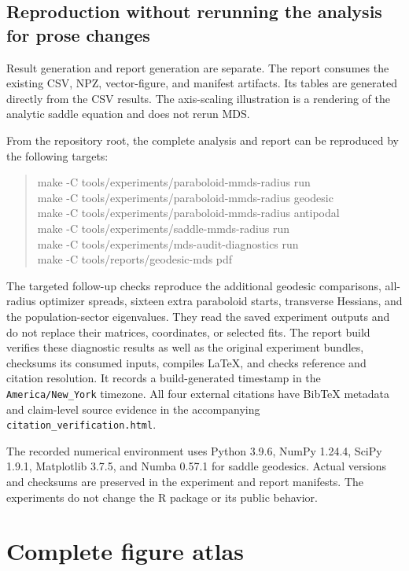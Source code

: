 \documentclass[11pt]{article}
\theoremstyle{remark}\newtheorem{remark}[proposition]{Remark}
\begin{document}
\subsection{Reproduction without rerunning the analysis for prose changes}
Result generation and report generation are separate. The report consumes
the existing CSV, NPZ, vector-figure, and manifest artifacts. Its tables are
generated directly from the CSV results. The axis-scaling illustration is a
rendering of the analytic saddle equation and does not rerun MDS.

From the repository root, the complete analysis and report can be reproduced by
the following targets:
\begin{quote}\small\ttfamily
make -C tools/experiments/paraboloid-mmds-radius run\\
make -C tools/experiments/paraboloid-mmds-radius geodesic\\
make -C tools/experiments/paraboloid-mmds-radius antipodal\\
make -C tools/experiments/saddle-mmds-radius run\\
make -C tools/experiments/mds-audit-diagnostics run\\
make -C tools/reports/geodesic-mds pdf
\end{quote}
The targeted follow-up checks reproduce the additional geodesic comparisons,
all-radius optimizer spreads, sixteen extra paraboloid starts, transverse
Hessians, and the population-sector eigenvalues. They read the saved experiment
outputs and do not replace their matrices, coordinates, or selected fits.
The report build verifies these diagnostic results as well as the original
experiment bundles, checksums its consumed
inputs, compiles LaTeX, and checks reference and citation resolution. It
records a build-generated timestamp in the \texttt{America/New\_York} timezone.
All four external citations have BibTeX metadata and claim-level source
evidence in the accompanying \texttt{citation\_verification.html}.

The recorded numerical environment uses Python 3.9.6, NumPy 1.24.4, SciPy 1.9.1,
Matplotlib 3.7.5, and Numba 0.57.1 for saddle geodesics. Actual versions and
checksums are preserved in the experiment and report manifests. The experiments
do not change the R package or its public behavior.

\clearpage
\section{Complete figure atlas}\label{app:figures}
\end{document}

